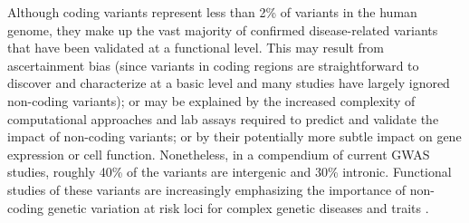 Although coding variants represent less than 2\% of variants in the human genome, they make up the vast majority of confirmed disease-related variants that have been validated at a functional level. This may result from ascertainment bias (since variants in coding regions are straightforward to discover and characterize at a basic level and many studies have largely ignored non-coding variants); or may be explained by the increased complexity of computational approaches and lab assays required to predict and validate the impact of non-coding variants; or by their potentially more subtle impact on gene expression or cell function. Nonetheless, in a compendium of current GWAS studies, roughly 40\% of the variants are intergenic and 30\% intronic. Functional studies of these variants are increasingly emphasizing the importance of non-coding genetic variation at risk loci for complex genetic diseases and traits \cite{hindorff2009potential}.

